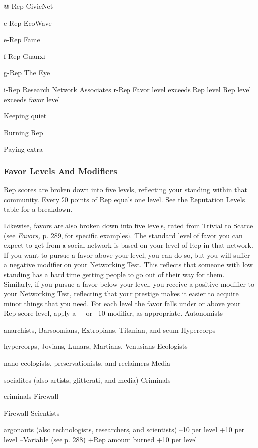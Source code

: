 @-Rep
CivicNet

c-Rep
EcoWave

e-Rep
Fame

f-Rep
Guanxi

g-Rep
The Eye

i-Rep
Research Network Associates r-Rep
Favor level exceeds Rep level
Rep level exceeds favor level

Keeping quiet

Burning Rep

Paying extra

\subsubsection{Favor Levels And Modifiers}

Rep scores are broken down into five levels, reflecting 
your standing within that community. Every 20 points 
of Rep equals one level. See the Reputation Levels 
table for a breakdown.

Likewise, favors are also broken down into five 
levels, rated from Trivial to Scarce (see \textit{Favors,} p. 289, 
for specific examples). The standard level of favor 
you can expect to get from a social network is based 
on your level of Rep in that network. If you want to 
pursue a favor above your level, you can do so, but 
you will suffer a negative modifier on your Networking
Test. This reflects that someone with low standing
has a hard time getting people to go out of their way 
for them. Similarly, if you pursue a favor below your 
level, you receive a positive modifier to your Networking
Test, reflecting that your prestige makes it easier to
acquire minor things that you need. For each level the 
favor falls under or above your Rep score level, apply 
a + or –10 modifier, as appropriate.
Autonomists

anarchists, Barsoomians, Extropians, Titanian, and scum
Hypercorps

hypercorps, Jovians, Lunars, Martians, Venusians
Ecologists

nano-ecologists, preservationists, and reclaimers
Media

socialites (also artists, glitterati, and media)
Criminals

criminals
Firewall

Firewall
Scientists

argonauts (also technologists, researchers, and scientists)
–10 per level
+10 per level
–Variable (see p. 288)
+Rep amount burned
+10 per level

